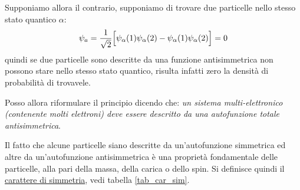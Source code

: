 Supponiamo allora il contrario, supponiamo di trovare due particelle nello stesso stato quantico $\alpha$:
\begin{equation}
\psi_a = \frac{1}{\sqrt{2}} \Bigl[ \psi_\alpha(1) \psi_\alpha(2) - \psi_\alpha(1) \psi_\alpha(2) \Bigr] = 0
\end{equation}
quindi se due particelle sono descritte da una funzione antisimmetrica non possono stare nello stesso stato quantico, risulta infatti zero la densità di probabilità di trovavele.

Posso allora riformulare il principio dicendo che: \textit{un sistema multi-elettronico (contenente molti elettroni) deve essere descritto da una autofunzione totale antisimmetrica}.

Il fatto che alcune particelle siano descritte da un'autofunzione simmetrica ed altre da un'autofunzione antisimmetrica è una proprietà fondamentale delle particelle, alla pari della massa, della carica o dello spin.
Si definisce quindi il \underline{carattere di simmetria}, vedi tabella \ref{tab_car_sim}.
